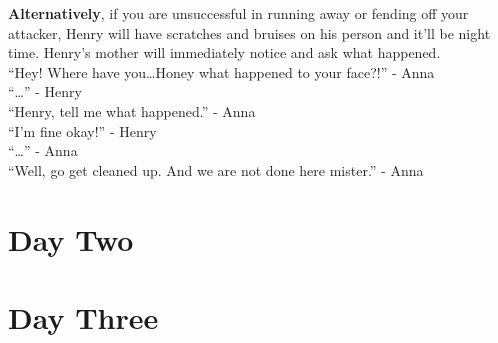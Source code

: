 \documentclass[12pt, a4paper]{article}
\begin{document}
            \textbf{Alternatively}, if you are unsuccessful in running away or fending off your attacker, Henry will have 
            scratches and bruises on his person and it'll be night time. Henry's mother will immediately notice and ask what happened.
            \\

            ``Hey! Where have you\ldots Honey what happened to your face?!'' - Anna
            \\

            ``\ldots'' - Henry
            \\

            ``Henry, tell me what happened.'' - Anna
            \\

            ``I'm fine okay!'' - Henry
            \\

            ``\ldots'' - Anna
            \\

            ``Well, go get cleaned up. And we are not done here mister.'' - Anna

            

	\section{Day Two}
	
	\section{Day Three}
\end{document}
